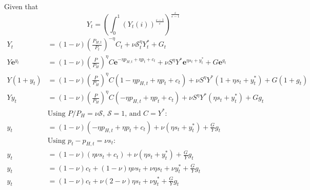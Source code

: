 Given that
\begin{equation}
    Y_t = \left( \int_{0}^{1} (Y_t(i))^{\frac{\varepsilon-1}{\varepsilon}}\right)^{\frac{\varepsilon}{\varepsilon-1}}
\end{equation}
\begin{align}
    Y_t &= (1-\nu)\left(\frac{P_{H,t}}{P_t}\right)^{-\eta}C_t + \nu \mathcal{S}_t^{\eta}Y_t^* + G_t\\
    Y \mathbf{e}^{y_t} &= (1-\nu)\left(\frac{P}{P_{H}}\right)^{\eta}C \mathbf{e}^{-\eta p_{H,t} + \eta p_t + c_t}+ \nu S^{\eta} Y^* \mathbf{e}^{\eta s_t + y^*_t} + G \mathbf{e}^{g_t}\\
    Y ({1+y_t}) &= (1-\nu)\left(\frac{P}{P_{H}}\right)^{\eta}C ({1 -\eta p_{H,t} + \eta p_t + c_t})+ \nu S^{\eta} Y^* ({1 + \eta s_t + y^*_t}) + G ({1+ g_t})\\
    Y y_t &= (1-\nu)\left(\frac{P}{P_{H}}\right)^{\eta}C ({-\eta p_{H,t} + \eta p_t + c_t})+ \nu S^{\eta} Y^* ({\eta s_t + y^*_t}) + G g_t\\
    &\text{Using $P/P_H = \mathcal{\nu S}$, $\mathcal{S} = 1$, and $C=Y^*$}:\\
    y_t &= (1-\nu)({-\eta p_{H,t} + \eta p_t + c_t})+ \nu ({\eta s_t + y^*_t}) + \frac{G}{Y} g_t\\
    &\text{Using $p_t - p_{H,t} = \nu s_t$}:\\
    y_t &= (1-\nu)({\eta \nu s_t + c_t})+ \nu ({\eta s_t + y^*_t}) + \frac{G}{Y} g_t\\
    y_t &= (1-\nu)c_t + (1-\nu) \eta \nu s_t + \nu {\eta s_t} + \nu y^*_t + \frac{G}{Y} g_t\\
    y_t &= (1-\nu)c_t + \nu (2-\nu)\eta s_t + \nu y^*_t + \frac{G}{Y} g_t\\
\end{align}
\pagebreak
